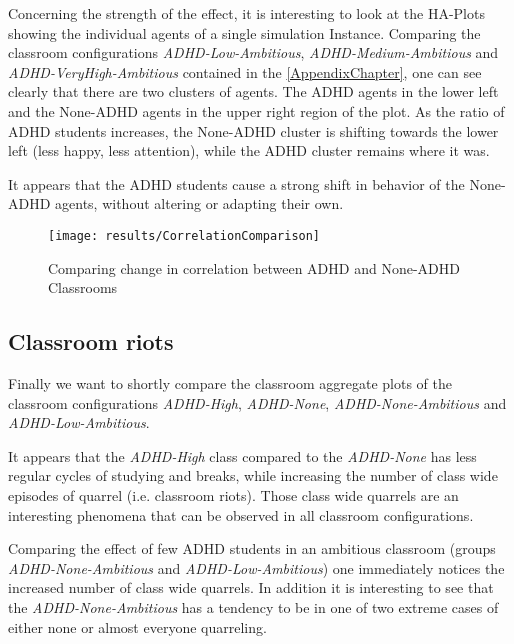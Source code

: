 Concerning the strength of the effect, it is interesting to look at the HA-Plots
showing the individual agents of a single simulation Instance. Comparing the classroom
configurations \textit{ADHD-Low-Ambitious}, \textit{ADHD-Medium-Ambitious} and
\textit{ADHD-VeryHigh-Ambitious} contained in the \ref{AppendixChapter}, one can
see clearly that there are two clusters of agents. The ADHD agents in the lower
left and the None-ADHD agents in the upper right region of the plot.
As the ratio of ADHD students increases, the None-ADHD cluster is shifting
towards the lower left (less happy, less attention), while the ADHD cluster remains
where it was.

\bb

It appears that the ADHD students cause a strong shift in behavior of the None-ADHD
agents, without altering or adapting their own.

\begin{figure}[]
    \centering
    \texttt{[image: results/CorrelationComparison]}
    \caption{Comparing change in correlation between ADHD and None-ADHD Classrooms}
    \label{CorrleationComparison}
\end{figure}

\subsection{Classroom riots}
Finally we want to shortly compare the classroom aggregate plots of the classroom
configurations \textit{ADHD-High}, \textit{ADHD-None},  \textit{ADHD-None-Ambitious} and
\textit{ADHD-Low-Ambitious}.

\bb

It appears that the \textit{ADHD-High} class compared to the \textit{ADHD-None}
has less regular cycles of studying and breaks, while increasing the number of
class wide episodes of quarrel (i.e. classroom riots). Those class wide quarrels
are an interesting phenomena that can be observed in all classroom configurations. 

\bb

Comparing the effect of few ADHD students in an ambitious classroom (groups
\textit{ADHD-None-Ambitious} and \textit{ADHD-Low-Ambitious}) one immediately
notices the increased number of class wide quarrels. In addition it is interesting
to see that the \textit{ADHD-None-Ambitious} has a tendency to be in one of
two extreme cases of either none or almost everyone quarreling. 
